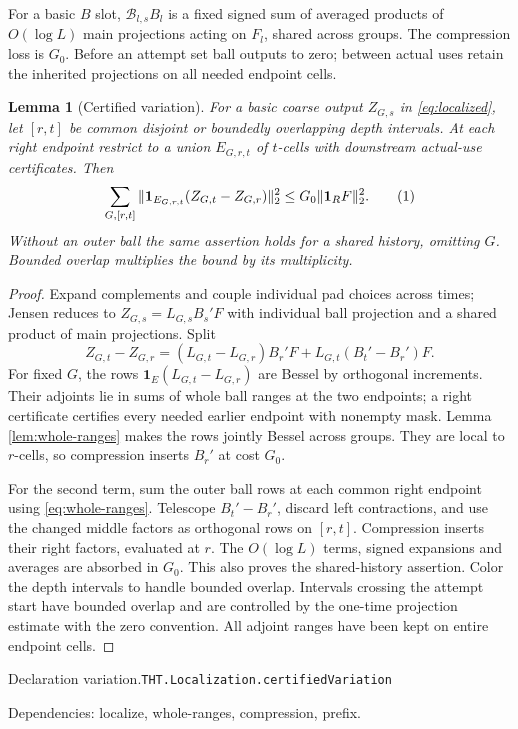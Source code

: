 \documentclass[11pt]{article}
\newtheorem{lemma}[theorem]{Lemma}
\theoremstyle{definition}
\newcommand{\one}{\mathbf 1}
\newcommand{\eqtag}[1]{\refstepcounter{equation}\tag{\theequation}\label{#1}}
\numberwithin{equation}{section}
\newcommand{\bp}[3]{\par\smallskip\begingroup\footnotesize
\noindent\hypertarget{bp:#1}{\textsf{Declaration #1.}}\quad\nolinkurl{#2}\par
\noindent\textsf{Dependencies:} #3.\par\endgroup\smallskip}
\begin{document}
For a basic $B$ slot, $\mathcal B_{l,s}B_l$ is a fixed signed sum of averaged products of $O(\log L)$ main projections acting on $F_l$, shared across groups. The compression loss is $G_0$. Before an attempt set ball outputs to zero; between actual uses retain the inherited projections on all needed endpoint cells.

\begin{lemma}[Certified variation]\label{lem:variation}
For a basic coarse output $Z_{G,s}$ in \eqref{eq:localized}, let $[r,t]$ be common disjoint or boundedly overlapping depth intervals. At each right endpoint restrict to a union $E_{G,r,t}$ of $t$-cells with downstream actual-use certificates. Then
\[
 \sum_{G,[r,t]}\|\one_{E_{G,r,t}}(Z_{G,t}-Z_{G,r})\|_2^2
 \le G_0\|\one_RF\|_2^2.
 \eqtag{eq:variation}
\]
Without an outer ball the same assertion holds for a shared history, omitting $G$. Bounded overlap multiplies the bound by its multiplicity.
\end{lemma}
\begin{proof}
Expand complements and couple individual pad choices across times; Jensen reduces to $Z_{G,s}=L_{G,s}B_s'F$ with individual ball projection and a shared product of main projections. Split
\[
 Z_{G,t}-Z_{G,r}=(L_{G,t}-L_{G,r})B_r'F+L_{G,t}(B_t'-B_r')F.
\]
For fixed $G$, the rows $\one_E(L_{G,t}-L_{G,r})$ are Bessel by orthogonal increments. Their adjoints lie in sums of whole ball ranges at the two endpoints; a right certificate certifies every needed earlier endpoint with nonempty mask. Lemma \ref{lem:whole-ranges} makes the rows jointly Bessel across groups. They are local to $r$-cells, so compression inserts $B_r'$ at cost $G_0$.

For the second term, sum the outer ball rows at each common right endpoint using \eqref{eq:whole-ranges}. Telescope $B_t'-B_r'$, discard left contractions, and use the changed middle factors as orthogonal rows on $[r,t]$. Compression inserts their right factors, evaluated at $r$. The $O(\log L)$ terms, signed expansions and averages are absorbed in $G_0$. This also proves the shared-history assertion. Color the depth intervals to handle bounded overlap. Intervals crossing the attempt start have bounded overlap and are controlled by the one-time projection estimate with the zero convention. All adjoint ranges have been kept on entire endpoint cells.
\end{proof}
\bp{variation}{THT.Localization.certifiedVariation}{localize, whole-ranges, compression, prefix}
\end{document}
